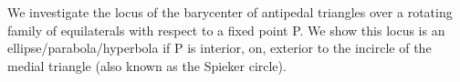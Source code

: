 We investigate the locus of the barycenter of antipedal triangles over a rotating family of equilaterals with respect to a fixed point P. We show this locus is an ellipse/parabola/hyperbola if P is interior, on, exterior to the incircle of the medial triangle (also known as the Spieker circle).